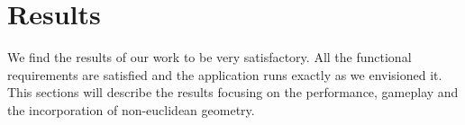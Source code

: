 \chapter{Results}\label{ch:results}
We find the results of our work to be very satisfactory.
All the functional requirements are satisfied and the application runs exactly as we envisioned it.
This sections will describe the results focusing on the performance, gameplay and the incorporation of non-euclidean geometry.



